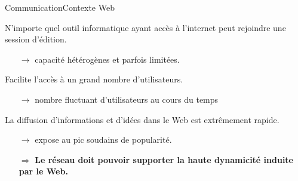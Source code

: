 

\begin{frame}{Communication}{Contexte Web}


  N'importe quel outil informatique ayant accès à l'internet peut rejoindre une
  session d'édition.
  \begin{itemize}
  \item [$\rightarrow$] capacité hétérogènes et parfois limitées.    
  \end{itemize}

  \vspace{0.5cm}
  
  Facilite l'accès à un grand nombre d'utilisateurs.
  \begin{itemize}
  \item [$\rightarrow$] nombre fluctuant d'utilisateurs au cours du temps
  \end{itemize}


  
  \vspace{0.5cm}

  La diffusion d'informations et d'idées dans le Web est extrêmement rapide. 
  \begin{itemize}
  \item [$\rightarrow$] expose au pic soudains de popularité.
  \end{itemize}


 
  \vspace{0.5cm}
  \large
  \begin{itemize}
  \item [$\Rightarrow$] \textbf{Le réseau doit pouvoir supporter la haute
      dynamicité induite par le Web.}
  \end{itemize}

\end{frame}



